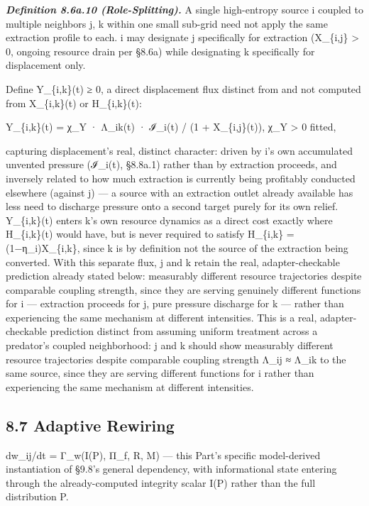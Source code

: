 \documentclass[
]{article}
\begin{document}
\emph{\textbf{Definition 8.6a.10 (Role-Splitting).}} A single
high-entropy source i coupled to multiple neighbors j, k within one
small sub-grid need not apply the same extraction profile to each. i may
designate j specifically for extraction (X\_\{i,j\} \textgreater{} 0,
ongoing resource drain per §8.6a) while designating k specifically for
displacement only.

Define Y\_\{i,k\}(t) ≥ 0, a direct displacement flux distinct from and
not computed from X\_\{i,k\}(t) or H\_\{i,k\}(t):

Y\_\{i,k\}(t) = χ\_Y · Λ\_ik(t) · ℐ\_i(t) / (1 + X\_\{i,j\}(t)), χ\_Y
\textgreater{} 0 fitted,

capturing displacement's real, distinct character: driven by i's own
accumulated unvented pressure (ℐ\_i(t), §8.8a.1) rather than by
extraction proceeds, and inversely related to how much extraction is
currently being profitably conducted elsewhere (against j) --- a source
with an extraction outlet already available has less need to discharge
pressure onto a second target purely for its own relief. Y\_\{i,k\}(t)
enters k's own resource dynamics as a direct cost exactly where
H\_\{i,k\}(t) would have, but is never required to satisfy H\_\{i,k\} =
(1−η\_i)X\_\{i,k\}, since k is by definition not the source of the
extraction being converted. With this separate flux, j and k retain the
real, adapter-checkable prediction already stated below: measurably
different resource trajectories despite comparable coupling strength,
since they are serving genuinely different functions for i ---
extraction proceeds for j, pure pressure discharge for k --- rather than
experiencing the same mechanism at different intensities. This is a
real, adapter-checkable prediction distinct from assuming uniform
treatment across a predator's coupled neighborhood: j and k should show
measurably different resource trajectories despite comparable coupling
strength Λ\_ij ≈ Λ\_ik to the same source, since they are serving
different functions for i rather than experiencing the same mechanism at
different intensities.

\hypertarget{adaptive-rewiring}{%
\subsection{8.7 Adaptive Rewiring}\label{adaptive-rewiring}}

dw\_ij/dt = Γ\_w(I(P), Π\_f, R, M) --- this Part's specific
model-derived instantiation of §9.8's general dependency, with
informational state entering through the already-computed integrity
scalar I(P) rather than the full distribution P.
\end{document}
